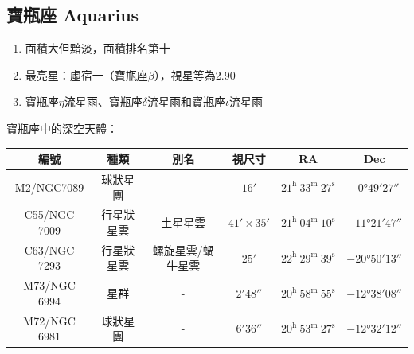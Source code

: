 \subsection{寶瓶座 Aquarius}
\begin{enumerate}
    \item 面積大但黯淡，面積排名第十
    \item 最亮星：虛宿一（寶瓶座\(\beta\)），視星等為2.90
    \item 寶瓶座\(\eta\)流星雨、寶瓶座\(\delta\)流星雨和寶瓶座\(\iota\)流星雨
\end{enumerate}
寶瓶座中的深空天體：
\newline

\begin{center}
\begin{longtable}{c | c | c | c | c | c}
    編號 & 種類 & 別名 & 視尺寸 & RA & Dec \\
    \hline
    \endfirsthead


    \endfoot

    \endlastfoot

    M2/NGC7089 & 球狀星團 & - & \(\ang{;16;}\) & \(21^\text{h }33^\text{m }27^\text{s}\) & \(-\ang{0;49;27}\) \\ %
    C55/NGC 7009 & 行星狀星雲 & 土星星雲 & \(\ang{;41;}\times\ang{;35;}\) & \(21^\text{h }04^\text{m }10^\text{s}\) & \(-\ang{11;21;47}\) \\ %
    C63/NGC 7293 & 行星狀星雲 & 螺旋星雲/蝸牛星雲 & \(\ang{;25;}\) & \(22^\text{h }29^\text{m }39^\text{s}\) & \(-\ang{20;50;13}\) \\ %
    M73/NGC 6994 & 星群 & - & \(\ang{;2;48}\) & \(20^\text{h }58^\text{m }55^\text{s}\) & \(-\ang{12;38;08}\) \\ %
    M72/NGC 6981 & 球狀星團 & - & \(\ang{;6;36}\) & \(20^\text{h }53^\text{m }27^\text{s}\) & \(-\ang{12;32;12}\) \\ %
\end{longtable}
\end{center}


